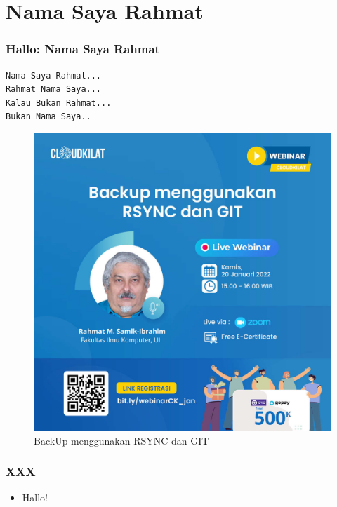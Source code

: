 \documentclass[xcolor=table, notheorems, hyperref={pdfpagelabels=false}]{beamer}
\begin{document}
\section{Nama Saya Rahmat}
\begin{frame}[fragile]
\frametitle{Hallo: Nama Saya Rahmat}
\begin{lstlisting}[basicstyle=\ttfamily\large]
Nama Saya Rahmat...
Rahmat Nama Saya...
Kalau Bukan Rahmat...
Bukan Nama Saya..
\end{lstlisting}
\begin{figure}
\includegraphics[width=0.39\linewidth]{JPG-012}
\caption{BackUp menggunakan RSYNC dan GIT}
\end{figure}
\end{frame}

\begin{frame}[fragile]
\frametitle{XXX}
\begin{itemize}
\item Hallo!
\end{itemize}
\end{frame}
\end{document}
